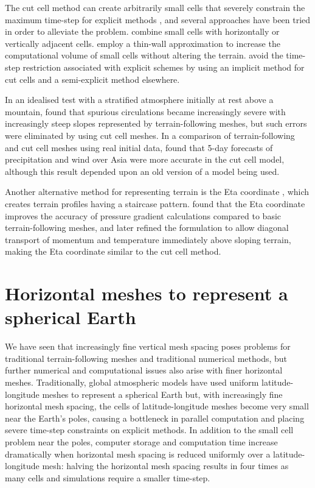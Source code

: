 The cut cell method can create arbitrarily small cells that severely constrain the maximum time-step for explicit methods \citep{klein2009}, and several approaches have been tried in order to alleviate the problem.
\citet{yamazaki-satomura2010} combine small cells with horizontally or vertically adjacent cells.
\citet{steppeler2002} employ a thin-wall approximation to increase the computational volume of small cells without altering the terrain.
\citet{jebens2011} avoid the time-step restriction associated with explicit schemes by using an implicit method for cut cells and a semi-explicit method elsewhere.

In an idealised test with a stratified atmosphere initially at rest above a mountain, \citet{good2014} found that spurious circulations became increasingly severe with increasingly steep slopes represented by terrain-following meshes, but such errors were eliminated by using cut cell meshes.
In a comparison of terrain-following and cut cell meshes using real initial data, \citet{steppeler2013} found that 5-day forecasts of precipitation and wind over Asia were more accurate in the cut cell model, although this result depended upon an old version of a model being used.

Another alternative method for representing terrain is the Eta coordinate \citep{mesinger1988}, which creates terrain profiles having a staircase pattern.
\citet{mesinger1988} found that the Eta coordinate improves the accuracy of pressure gradient calculations compared to basic terrain-following meshes, and \citet{mesinger2012} later refined the formulation to allow diagonal transport of momentum and temperature immediately above sloping terrain, making the Eta coordinate similar to the cut cell method.

\section{Horizontal meshes to represent a spherical Earth}

We have seen that increasingly fine vertical mesh spacing poses problems for traditional terrain-following meshes and traditional numerical methods, but further numerical and computational issues also arise with finer horizontal meshes.
Traditionally, global atmospheric models have used uniform latitude-longitude meshes to represent a spherical Earth but, with increasingly fine horizontal mesh spacing, the cells of latitude-longitude meshes become very small near the Earth’s poles, causing a bottleneck in parallel computation \citep{staniforth-thuburn2012} and placing severe time-step constraints on explicit methods.
In addition to the small cell problem near the poles, computer storage and computation time increase dramatically when horizontal mesh spacing is reduced uniformly over a latitude-longitude mesh: halving the horizontal mesh spacing results in four times as many cells and simulations require a smaller time-step.

